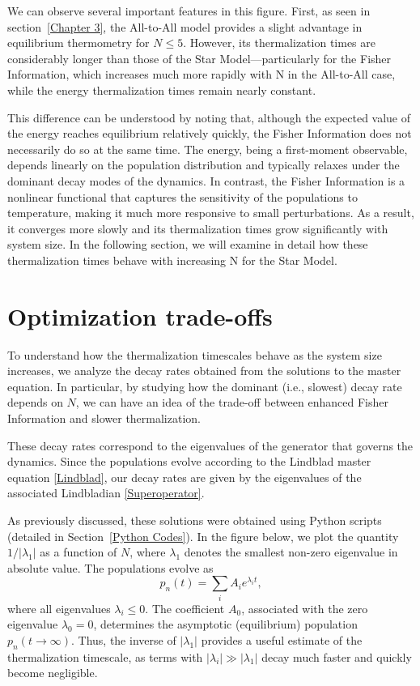 We can observe several important features in this figure. First, as seen in section~\ref{Chapter 3}, the All-to-All model provides a slight advantage in equilibrium thermometry for $N \leq 5$. However, its thermalization times are considerably longer than those of the Star Model—particularly for the Fisher Information, which increases much more rapidly with N in the All-to-All case, while the energy thermalization times remain nearly constant.

This difference can be understood by noting that, although the expected value of the energy reaches equilibrium relatively quickly, the Fisher Information does not necessarily do so at the same time. The energy, being a first-moment observable, depends linearly on the population distribution and typically relaxes under the dominant decay modes of the dynamics. In contrast, the Fisher Information is a nonlinear functional that captures the sensitivity of the populations to temperature, making it much more responsive to small perturbations. As a result, it converges more slowly and its thermalization times grow significantly with system size. In the following section, we will examine in detail how these thermalization times behave with increasing N for the Star Model.

\section{Optimization trade-offs}\label{Trade offs}
To understand how the thermalization timescales behave as the system size increases, we analyze the decay rates obtained from the solutions to the master equation. In particular, by studying how the dominant (i.e., slowest) decay rate depends on $N$, we can have an idea of the trade-off between enhanced Fisher Information and slower thermalization.

These decay rates correspond to the eigenvalues of the generator that governs the dynamics. Since the populations evolve according to the Lindblad master equation \eqref{Lindblad}, our decay rates are given by the eigenvalues of the associated Lindbladian \eqref{Superoperator}.

As previously discussed, these solutions were obtained using Python scripts (detailed in Section~\ref{Python Codes}). In the figure below, we plot the quantity $1/|\lambda_1|$ as a function of $N$, where $\lambda_1$ denotes the smallest non-zero eigenvalue in absolute value. The populations evolve as
\begin{equation}
    p_n(t) = \sum_i A_i e^{\lambda_i t},
\end{equation}
where all eigenvalues $\lambda_i \leq 0$. The coefficient $A_0$, associated with the zero eigenvalue $\lambda_0 = 0$, determines the asymptotic (equilibrium) population $p_n(t \to \infty)$. Thus, the inverse of $|\lambda_1|$ provides a useful estimate of the thermalization timescale, as terms with $|\lambda_i| \gg |\lambda_1|$ decay much faster and quickly become negligible.

